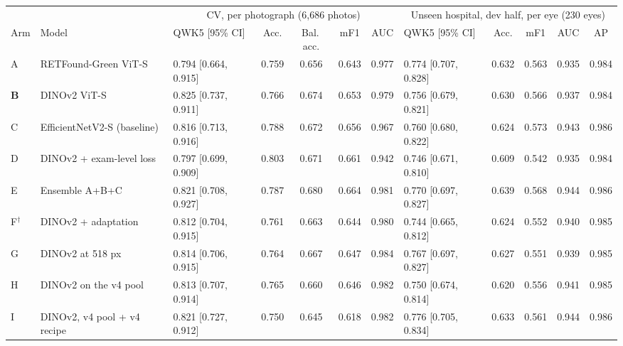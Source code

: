 \begin{tabular}{@{}ll@{\hspace{4pt}}lcccc@{\hspace{6pt}}lcccc@{}}
\toprule
 & & \multicolumn{5}{c}{CV, per photograph (6{,}686 photos)} & \multicolumn{5}{c}{Unseen hospital, dev half, per eye (230 eyes)}\\
\cmidrule(lr){3-7}\cmidrule(l){8-12}
Arm & Model & QWK5 [95\% CI] & Acc. & Bal.\,acc. & mF1 & AUC & QWK5 [95\% CI] & Acc. & mF1 & AUC & AP\\
\midrule
A & RETFound-Green ViT-S & 0.794 [0.664, 0.915] & 0.759 & 0.656 & 0.643 & 0.977 & 0.774 [0.707, 0.828] & 0.632 & 0.563 & 0.935 & 0.984 \\
\textbf{B} & DINOv2 ViT-S & 0.825 [0.737, 0.911] & 0.766 & 0.674 & 0.653 & 0.979 & 0.756 [0.679, 0.821] & 0.630 & 0.566 & 0.937 & 0.984 \\
C & EfficientNetV2-S (baseline) & 0.816 [0.713, 0.916] & 0.788 & 0.672 & 0.656 & 0.967 & 0.760 [0.680, 0.822] & 0.624 & 0.573 & 0.943 & 0.986 \\
D & DINOv2 + exam-level loss & 0.797 [0.699, 0.909] & 0.803 & 0.671 & 0.661 & 0.942 & 0.746 [0.671, 0.810] & 0.609 & 0.542 & 0.935 & 0.984 \\
E & Ensemble A+B+C & 0.821 [0.708, 0.927] & 0.787 & 0.680 & 0.664 & 0.981 & 0.770 [0.697, 0.827] & 0.639 & 0.568 & 0.944 & 0.986 \\
F$^\dagger$ & DINOv2 + adaptation & 0.812 [0.704, 0.915] & 0.761 & 0.663 & 0.644 & 0.980 & 0.744 [0.665, 0.812] & 0.624 & 0.552 & 0.940 & 0.985 \\
G & DINOv2 at 518 px & 0.814 [0.706, 0.915] & 0.764 & 0.667 & 0.647 & 0.984 & 0.767 [0.697, 0.827] & 0.627 & 0.551 & 0.939 & 0.985 \\
H & DINOv2 on the v4 pool & 0.813 [0.707, 0.914] & 0.765 & 0.660 & 0.646 & 0.982 & 0.750 [0.674, 0.814] & 0.620 & 0.556 & 0.941 & 0.985 \\
I & DINOv2, v4 pool + v4 recipe & 0.821 [0.727, 0.912] & 0.750 & 0.645 & 0.618 & 0.982 & 0.776 [0.705, 0.834] & 0.633 & 0.561 & 0.944 & 0.986 \\
\bottomrule
\end{tabular}
